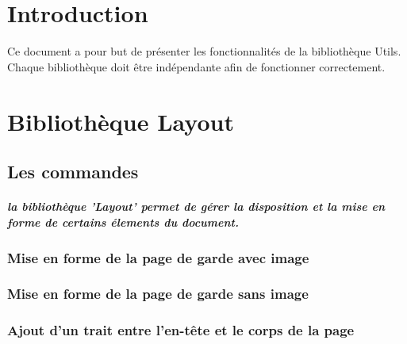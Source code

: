\chapter*{Introduction}


Ce document a pour but de présenter les fonctionnalités de la bibliothèque Utils. \n
Chaque bibliothèque doit être indépendante afin de fonctionner correctement.



\chapter{Bibliothèque Layout}


\section{Les commandes}

\paragraph{la bibliothèque 'Layout' permet de gérer la disposition et la mise en forme de certains élements du document. \\}

\subsection{Mise en forme de la page de garde avec image}


\subsection{Mise en forme de la page de garde sans image}


\subsection{Ajout d'un trait entre l'en-tête et le corps de la page}


